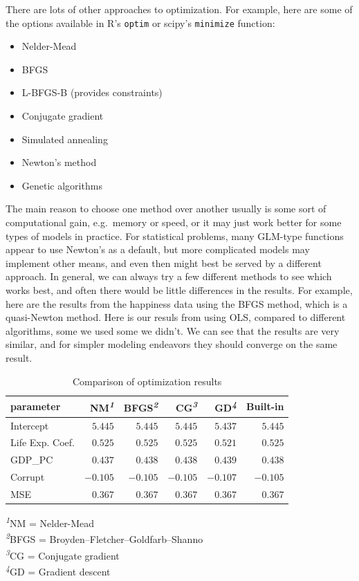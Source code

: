 \documentclass[
  letterpaper,
]{krantz}
\providecommand{\tightlist}{%
  \setlength{\itemsep}{0pt}\setlength{\parskip}{0pt}}\usepackage{longtable,booktabs,array}
\begin{document}
There are lots of other approaches to optimization. For example, here
are some of the options available in R's \texttt{optim} or scipy's
\texttt{minimize} function:

\begin{itemize}
\tightlist
\item
  Nelder-Mead
\item
  BFGS
\item
  L-BFGS-B (provides constraints)
\item
  Conjugate gradient
\item
  Simulated annealing
\item
  Newton's method
\item
  Genetic algorithms
\end{itemize}

The main reason to choose one method over another usually is some sort
of computational gain, e.g.~memory or speed, or it may just work better
for some types of models in practice. For statistical problems, many
GLM-type functions appear to use Newton's as a default, but more
complicated models may implement other means, and even then might best
be served by a different approach. In general, we can always try a few
different methods to see which works best, and often there would be
little differences in the results. For example, here are the results
from the happiness data using the BFGS method, which is a quasi-Newton
method. Here is our resuls from using OLS, compared to different
algorithms, some we used some we didn't. We can see that the results are
very similar, and for simpler modeling endeavors they should converge on
the same result.

\hypertarget{tbl-optim-compare}{}
\setlength{\LTpost}{0mm}
\begin{longtable}{lrrrrr}
\caption{\label{tbl-optim-compare}Comparison of optimization results }\tabularnewline

\toprule
parameter & NM\textsuperscript{\textit{1}} & BFGS\textsuperscript{\textit{2}} & CG\textsuperscript{\textit{3}} & GD\textsuperscript{\textit{4}} & Built-in \\ 
\midrule
Intercept & $5.445$ & $5.445$ & $5.445$ & $5.437$ & $5.445$ \\ 
Life Exp. Coef. & $0.525$ & $0.525$ & $0.525$ & $0.521$ & $0.525$ \\ 
GDP\_PC & $0.437$ & $0.438$ & $0.438$ & $0.439$ & $0.438$ \\ 
Corrupt & $-0.105$ & $-0.105$ & $-0.105$ & $-0.107$ & $-0.105$ \\ 
MSE & $0.367$ & $0.367$ & $0.367$ & $0.367$ & $0.367$ \\ 
\bottomrule
\end{longtable}
\begin{minipage}{\linewidth}
\textsuperscript{\textit{1}}NM = Nelder-Mead\\
\textsuperscript{\textit{2}}BFGS = Broyden–Fletcher–Goldfarb–Shanno\\
\textsuperscript{\textit{3}}CG = Conjugate gradient\\
\textsuperscript{\textit{4}}GD = Gradient descent\\
\end{minipage}
\end{document}
